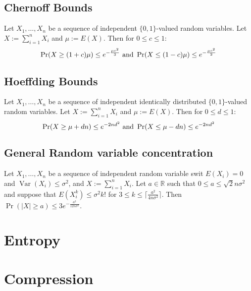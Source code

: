 \subsection{Chernoff Bounds}
Let $X_1,\ldots,X_n$ be a sequence of independent $\{0,1\}$-valued random variables. Let $X := \sum^n_{i=1}X_i$ and $\mu := E(X)$. Then for $0 \leq c \leq 1$:
\begin{equation*}
\operatorname{Pr}(X \geq (1+c)\mu)\leq e^{-\frac{\mu c^2}{3}}\\
\text{ and } \operatorname{Pr}(X \leq (1-c)\mu)\leq e^{-\frac{\mu c^2}{2}}
\end{equation*}
\subsection{Hoeffding Bounds}
Let $X_1,\ldots,X_n$ be a sequence of independent identically distributed $\{0,1\}$-valued random variables. Let $X := \sum^n_{i=1}X_i$ and $\mu := E(X)$. Then for $0 \leq d \leq 1$:
\begin{equation*}
\operatorname{Pr}(X \geq \mu +dn)\leq e^{-2nd^2}\\
\text{ and } \operatorname{Pr}(X \leq \mu -dn)\leq e^{-2nd^2}
\end{equation*}
\subsection{General Random variable concentration}
\begin{theorem}
Let $X_1,\ldots,X_n$ be a sequence of independent random variable swit $E(X_i) = 0$ and $\operatorname{Var}(X_i) \leq \sigma^2$, and $X:= \sum^{n}_{i=1}X_i$. Let $a \in \mathbb{R}$ such that $0\leq a\leq \sqrt{2}n\sigma^2$ and suppose that $E(X_i^k) \leq \sigma^2k!$ for $3 \leq k \leq \lceil\frac{a^2}{4n\sigma^2}\rceil$. Then $\operatorname{Pr}(|X| \geq a) \leq 3e^{-\frac{a^2}{12n\sigma^2}}$.
\end{theorem}
\section{Entropy}
\section{Compression}